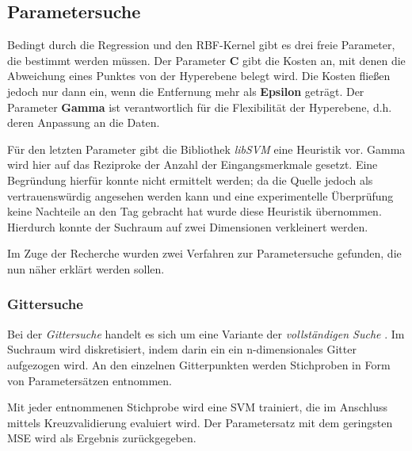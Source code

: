 \subsection{Parametersuche}
\label{subsec:Parametersuche}
Bedingt durch die Regression und den RBF-Kernel gibt es drei freie Parameter, die bestimmt werden müssen. Der Parameter \textbf{C} gibt die Kosten an, mit denen die Abweichung eines Punktes von der Hyperebene belegt wird. Die Kosten fließen jedoch nur dann ein, wenn die Entfernung mehr als \textbf{Epsilon} geträgt. Der Parameter \textbf{Gamma} ist verantwortlich für die Flexibilität der Hyperebene, d.h. deren Anpassung an die Daten.

Für den letzten Parameter gibt die Bibliothek \textit{libSVM} eine Heuristik vor. Gamma wird hier auf das  Reziproke der Anzahl der Eingangsmerkmale gesetzt. Eine Begründung hierfür konnte nicht ermittelt werden; da die Quelle jedoch als vertrauenswürdig angesehen werden kann und eine experimentelle Überprüfung keine Nachteile an den Tag gebracht hat wurde diese Heuristik übernommen. Hierdurch konnte der Suchraum auf zwei Dimensionen verkleinert werden.

Im Zuge der Recherche wurden zwei Verfahren zur Parametersuche gefunden, die nun näher erklärt werden sollen.

\subsubsection{Gittersuche}
\label{subsubsec:Gittersuche}
Bei der \textit{Gittersuche} handelt es sich um eine Variante der \textit{vollständigen Suche} \cite{HsuLibsvmTutorial2003}. Im Suchraum wird diskretisiert, indem darin ein ein n-dimensionales Gitter aufgezogen wird. An den einzelnen Gitterpunkten werden Stichproben in Form von Parametersätzen entnommen.

Mit jeder entnommenen Stichprobe wird eine SVM trainiert, die im Anschluss mittels  Kreuzvalidierung evaluiert wird. Der Parametersatz mit dem geringsten MSE wird als Ergebnis zurückgegeben.

